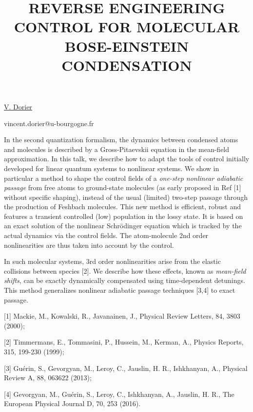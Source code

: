 \title{REVERSE ENGINEERING CONTROL FOR MOLECULAR BOSE-EINSTEIN CONDENSATION}

\underline{V. Dorier} 

{\normalsize{\vspace{-4mm}
\dijon

\email vincent.dorier@u-bourgogne.fr}}

In the second quantization formalism, the dynamics between condensed atoms and molecules is described by a Gross-Pitaevskii equation in the mean-field approximation. In this talk, we describe how to adapt the tools of control initially developed for linear quantum systems to nonlinear systems. We show in particular a method to shape the control fields of a \emph{one-step nonlinear adiabatic passage} from free atoms to ground-state molecules (as early proposed in Ref [1] without specific shaping), instead of the usual (limited) two-step passage through the production of Feshbach molecules. This new method is efficient, robust and features a transient controlled (low) population in the lossy state. It is based on an exact solution of the nonlinear Schr\"odinger equation which is tracked by the actual dynamics via the control fields. The atom-molecule 2nd order nonlinearities are thus taken into account by the control.

In such molecular systems, 3rd order nonlinearities arise from the elastic collisions between species [2]. We describe how these effects, known as \emph{mean-field shifts}, can be exactly dynamically compensated using time-dependent detunings. This method generalizes nonlinear adiabatic passage techniques [3,4] to exact passage.

{\normalsize
[1] Mackie, M., Kowalski, R., Javanainen, J., Physical Review Letters, 84, 3803 (2000);
\vsp

[2] Timmermans, E., Tommasini, P., Hussein, M., Kerman, A., Physics Reports, 315, 199-230 (1999);
\vsp

[3] Gu\'erin, S., Gevorgyan, M., Leroy, C., Jauslin, H. R., Ishkhanyan, A., Physical Review A, 88, 063622 (2013);
\vsp

[4] Gevorgyan, M., Gu\'erin, S., Leroy, C., Ishkhanyan, A., Jauslin, H. R., The European Physical Journal D, 70, 253 (2016).
}

\vspace{\baselineskip}
